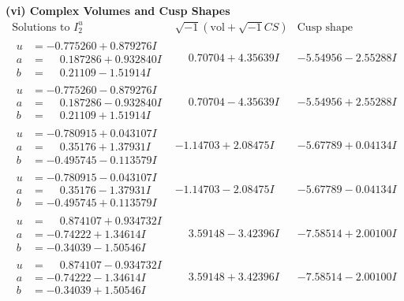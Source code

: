 \documentclass[1p]{elsarticle_modified}
\theoremstyle{definition}
\newcommand{\I}{\sqrt{-1}}
\begin{document}
\newpage\flushleft \textbf{(vi) Complex Volumes and Cusp Shapes}
$$\begin{array}{c|c|c}  
\text{Solutions to }I^u_{2}& \I (\text{vol} + \sqrt{-1}CS) & \text{Cusp shape}\\
 \hline 
\begin{aligned}
u &= -0.775260 + 0.879276 I \\
a &= \phantom{-}0.187286 + 0.932840 I \\
b &= \phantom{-}0.21109 - 1.51914 I\end{aligned}
 & \phantom{-}0.70704 + 4.35639 I & -5.54956 - 2.55288 I \\ \hline\begin{aligned}
u &= -0.775260 - 0.879276 I \\
a &= \phantom{-}0.187286 - 0.932840 I \\
b &= \phantom{-}0.21109 + 1.51914 I\end{aligned}
 & \phantom{-}0.70704 - 4.35639 I & -5.54956 + 2.55288 I \\ \hline\begin{aligned}
u &= -0.780915 + 0.043107 I \\
a &= \phantom{-}0.35176 + 1.37931 I \\
b &= -0.495745 - 0.113579 I\end{aligned}
 & -1.14703 + 2.08475 I & -5.67789 + 0.04134 I \\ \hline\begin{aligned}
u &= -0.780915 - 0.043107 I \\
a &= \phantom{-}0.35176 - 1.37931 I \\
b &= -0.495745 + 0.113579 I\end{aligned}
 & -1.14703 - 2.08475 I & -5.67789 - 0.04134 I \\ \hline\begin{aligned}
u &= \phantom{-}0.874107 + 0.934732 I \\
a &= -0.74222 + 1.34614 I \\
b &= -0.34039 - 1.50546 I\end{aligned}
 & \phantom{-}3.59148 - 3.42396 I & -7.58514 + 2.00100 I \\ \hline\begin{aligned}
u &= \phantom{-}0.874107 - 0.934732 I \\
a &= -0.74222 - 1.34614 I \\
b &= -0.34039 + 1.50546 I\end{aligned}
 & \phantom{-}3.59148 + 3.42396 I & -7.58514 - 2.00100 I \\ \hline\begin{aligned}

\end{aligned}
\end{array}$$
\end{document}
